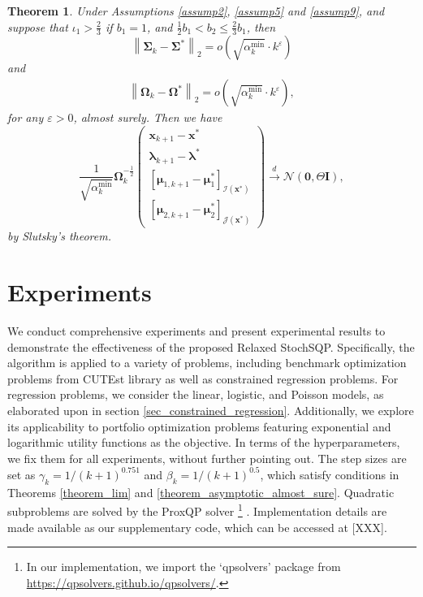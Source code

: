 \documentclass[aos]{imsart}
\numberwithin{equation}{section}
\theoremstyle{plain}
\newtheorem{theorem}{Theorem}
\begin{document}
\begin{theorem}
\label{theorem_pratical_normality}
    Under Assumptions \ref{assump2}, \ref{assump5} and  \ref{assump9}, and suppose that $\iota_1>\frac{2}{3}$ if $b_1=1$, and $\frac{1}{2} b_1 < b_2 \leq \frac{2}{3}b_1$, then 
    \begin{equation}
        \left\| \bm{\Sigma}_{k} - \bm{\Sigma}^{*} \right\|_2 = o\left( \sqrt{\alpha_k^{\text{min}}} \cdot k^{\varepsilon}\right)
    \end{equation}
    and
    \begin{equation}
        \begin{split}
             \left\| \bm{\Omega}_{k} - \bm{\Omega}^{*} \right\|_2 = o\left( \sqrt{\alpha_k^{\text{min}}} \cdot k^{\varepsilon}\right),
        \end{split}
    \end{equation}
    for any $\varepsilon > 0$, almost surely. Then we have
    \begin{equation}
        \frac{1}{\sqrt{\alpha_k^{\text{min}}}} \bm{\Omega}_k^{-\frac{1}{2}}\left( \begin{array}{c}
    \bm{x}_{k+1} - \bm{x}^{*}  \\
    \bm{\lambda}_{k+1} - \bm{\lambda}^{*} \\
    \left[ \bm{\mu}_{1,k+1} - \bm{\mu}_{1}^{*}\right]_{\mathcal{I}(\bm{x}^{*})} \\
    \left[ \bm{\mu}_{2,k+1} - \bm{\mu}_{2}^{*} \right]_{\mathcal{J}(\bm{x}^{*})} 
    \end{array} \right) \stackrel{d}{\longrightarrow} \mathcal{N} \left( \bm{0}, \Theta \bm{I}\right),
    \end{equation}
    by Slutsky's theorem. 
\end{theorem}

\section{Experiments}
\label{sec:experiments}
We conduct comprehensive experiments and present experimental results to demonstrate the effectiveness of the proposed Relaxed StochSQP. Specifically, the algorithm is applied to a variety of problems, including benchmark optimization problems from CUTEst library \cite{gould2015cutest, fowkes2022pycutest} as well as constrained regression problems. For regression problems, we consider the linear, logistic, and Poisson models, as elaborated upon in section \ref{sec_constrained_regression}. Additionally, we explore its applicability to portfolio optimization problems featuring exponential and logarithmic utility functions as the objective. In terms of the hyperparameters, we fix them for all experiments, without further pointing out. The step sizes are set as $\gamma_k = 1/(k+1)^{0.751}$ and $\beta_k = 1 / (k+1)^{0.5}$, which satisfy conditions in Theorems \ref{theorem_lim} and \ref{theorem_asymptotic_almost_sure}. Quadratic subproblems are solved by the ProxQP solver \footnote{In our implementation, we import the `qpsolvers' package from \url{https://qpsolvers.github.io/qpsolvers/}.} \cite{bambade2022prox}. Implementation details are made available as our supplementary code, which can be accessed at [XXX].
\end{document}
